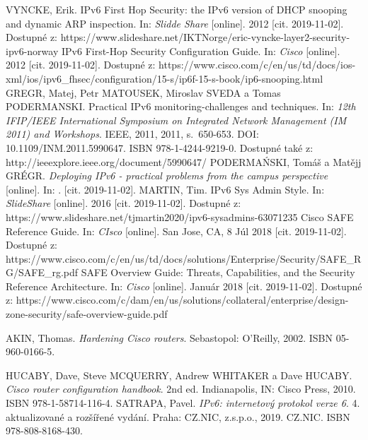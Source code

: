 \begin{literatura}{99}
VYNCKE, Erik. IPv6 First Hop Security: the IPv6 version of DHCP snooping and dynamic ARP inspection. In: \textit{Slidde Share} [online]. 2012 [cit. 2019-11-02]. Dostupné z: https://www.slideshare.net/IKTNorge/eric-vyncke-layer2-security-ipv6-norway
IPv6 First-Hop Security Configuration Guide. In: \textit{Cisco} [online]. 2012 [cit. 2019-11-02]. Dostupné z: https://www.cisco.com/c/en/us/td/docs/ios-xml/ios/ipv6\_fhsec/configuration/15-s/ip6f-15-s-book/ip6-snooping.html
GREGR, Matej, Petr MATOUSEK, Miroslav SVEDA a Tomas PODERMANSKI. Practical IPv6 monitoring-challenges and techniques. In: \textit{12th IFIP/IEEE International Symposium on Integrated Network Management (IM 2011) and Workshops}. IEEE, 2011, 2011, s.~650-653. DOI: 10.1109/INM.2011.5990647. ISBN 978-1-4244-9219-0. Dostupné také z: http://ieeexplore.ieee.org/document/5990647/
PODERMAŃSKI, Tomáš a Matějj GRÉGR. \textit{Deploying IPv6 - practical problems from the campus perspective} [online]. In: . [cit. 2019-11-02].
MARTIN, Tim. IPv6 Sys Admin Style. In: \textit{SlideShare} [online]. 2016 [cit. 2019-11-02]. Dostupné z: https://www.slideshare.net/tjmartin2020/ipv6-sysadmins-63071235
Cisco SAFE Reference Guide. In: \textit{CIsco} [online]. San Jose, CA, 8 Júl 2018 [cit. 2019-11-02]. Dostupné z: https://www.cisco.com/c/en/us/td/docs/solutions/Enterprise/Security/SAFE\_RG/SAFE\_rg.pdf
SAFE Overview Guide: Threats, Capabilities, and the Security Reference Architecture. In: \textit{Cisco} [online]. Január 2018 [cit. 2019-11-02]. Dostupné z: https://www.cisco.com/c/dam/en/us/solutions/collateral/enterprise/design-zone-security/safe-overview-guide.pdf

AKIN, Thomas. \textit{Hardening Cisco routers}. Sebastopol: O'Reilly, 2002. ISBN 05-960-0166-5.

HUCABY, Dave, Steve MCQUERRY, Andrew WHITAKER a Dave HUCABY. \textit{Cisco router configuration handbook}. 2nd ed. Indianapolis, IN: Cisco Press, 2010. ISBN 978-1-58714-116-4.
SATRAPA, Pavel. \textit{IPv6: internetový protokol verze 6}. 4. aktualizované a rozšířené vydání. Praha: CZ.NIC, z.s.p.o., 2019. CZ.NIC. ISBN 978-808-8168-430.



\end{literatura}


%
%
%
